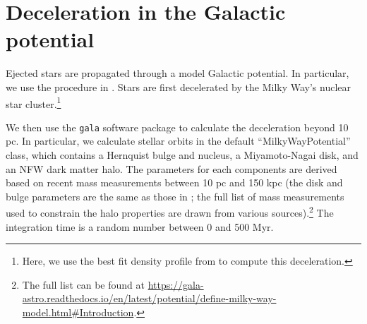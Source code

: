 \documentclass[fleqn,usenatbib]{mnras}
\begin{document}


\appendix

\section{Deceleration in the Galactic potential}
\label{app:decel}

Ejected stars are propagated through a model Galactic potential. In particular, we use the procedure in \citet{generozov2020}. Stars are first decelerated by the Milky Way's nuclear star cluster.\footnote{Here, we use the best fit density profile from \citep{schodel+2018} to compute this deceleration.}  

We then use the \texttt{gala} software package \citep{gala} to calculate the deceleration beyond 10 pc. In particular, we calculate stellar orbits in the default ``MilkyWayPotential'' class, which contains a Hernquist bulge and nucleus, a Miyamoto-Nagai disk, and an NFW dark matter halo. The parameters for each components are derived based on recent mass measurements between 10 pc and 150 kpc (the disk and bulge parameters are the same as those in \citealt{bovy2015}; the full list of mass measurements used to constrain the halo properties are drawn from various sources).\footnote{The full list can be found at \url{https://gala-astro.readthedocs.io/en/latest/potential/define-milky-way-model.html\#Introduction}.} The integration time is a random number between 0 and 500 Myr.




\bsp	%
\label{lastpage}
\end{document}
